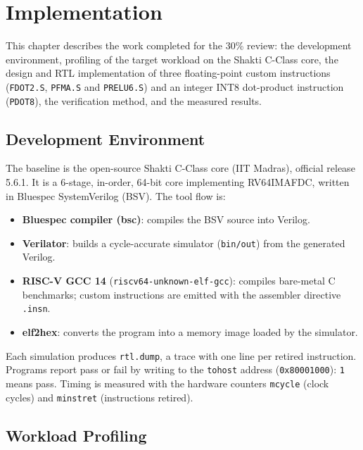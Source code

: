 
\chapter{Implementation}

This chapter describes the work completed for the 30\% review: the
development environment, profiling of the target workload on the Shakti
C-Class core, the design and RTL implementation of three floating-point
custom instructions (\texttt{FDOT2.S}, \texttt{PFMA.S} and \texttt{PRELU6.S})
and an integer INT8 dot-product instruction (\texttt{PDOT8}), the
verification method, and the measured results.

\section{Development Environment}

The baseline is the open-source Shakti C-Class core (IIT Madras), official
release 5.6.1. It is a 6-stage, in-order, 64-bit core implementing
RV64IMAFDC, written in Bluespec SystemVerilog (BSV). The tool flow is:

\begin{itemize}
  \item \textbf{Bluespec compiler (bsc)}: compiles the BSV source into Verilog.
  \item \textbf{Verilator}: builds a cycle-accurate simulator (\texttt{bin/out})
        from the generated Verilog.
  \item \textbf{RISC-V GCC 14} (\texttt{riscv64-unknown-elf-gcc}): compiles
        bare-metal C benchmarks; custom instructions are emitted with the
        assembler directive \texttt{.insn}.
  \item \textbf{elf2hex}: converts the program into a memory image loaded by
        the simulator.
\end{itemize}

Each simulation produces \texttt{rtl.dump}, a trace with one line per
retired instruction. Programs report pass or fail by writing to the
\texttt{tohost} address (\texttt{0x80001000}): \texttt{1} means pass. Timing
is measured with the hardware counters \texttt{mcycle} (clock cycles) and
\texttt{minstret} (instructions retired).

\section{Workload Profiling}

